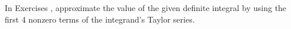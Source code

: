 {\noindent In Exercises}
{, approximate the value of the given definite integral by using the first 4 nonzero terms of the integrand's Taylor series. 
}
